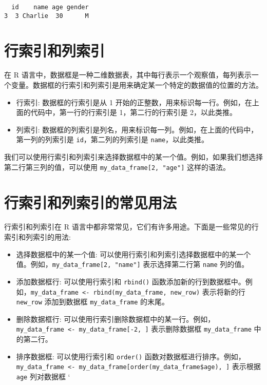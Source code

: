 \documentclass[
  letterpaper,
  DIV=11,
  numbers=noendperiod]{scrreprt}
\providecommand{\tightlist}{%
  \setlength{\itemsep}{0pt}\setlength{\parskip}{0pt}}\usepackage{longtable,booktabs,array}
\begin{document}
\begin{verbatim}
  id    name age gender
3  3 Charlie  30      M
\end{verbatim}

\section{行索引和列索引}\label{ux884cux7d22ux5f15ux548cux5217ux7d22ux5f15-1}

在 R
语言中，数据框是一种二维数据表，其中每行表示一个观察值，每列表示一个变量。数据框的行索引和列索引是用来确定某一个特定的数据值的位置的方法。

\begin{itemize}
\tightlist
\item
  行索引: 数据框的行索引是从 1
  开始的正整数，用来标识每一行。例如，在上面的代码中，第一行的行索引是
  1，第二行的行索引是 2，以此类推。
\item
  列索引:
  数据框的列索引是列名，用来标识每一列。例如，在上面的代码中，第一列的列索引是
  \texttt{id}，第二列的列索引是 \texttt{name}，以此类推。
\end{itemize}

我们可以使用行索引和列索引来选择数据框中的某一个值。例如，如果我们想选择第二行第三列的值，可以使用
\texttt{my\_data\_frame{[}2,\ "age"{]}} 这样的语法。

\section{行索引和列索引的常见用法}\label{ux884cux7d22ux5f15ux548cux5217ux7d22ux5f15ux7684ux5e38ux89c1ux7528ux6cd5-1}

行索引和列索引在 R
语言中都非常常见，它们有许多用途。下面是一些常见的行索引和列索引的用法:

\begin{itemize}
\tightlist
\item
  选择数据框中的某一个值:
  可以使用行索引和列索引选择数据框中的某一个值。例如，\texttt{my\_data\_frame{[}2,\ "name"{]}}
  表示选择第二行第 \texttt{name} 列的值。
\item
  添加数据框行: 可以使用行索引和 \texttt{rbind()}
  函数添加新的行到数据框中。例如，\texttt{my\_data\_frame\ \textless{}-\ rbind(my\_data\_frame,\ new\_row)}
  表示将新的行 \texttt{new\_row} 添加到数据框 \texttt{my\_data\_frame}
  的末尾。
\item
  删除数据框行:
  可以使用行索引删除数据框中的某一行。例如，\texttt{my\_data\_frame\ \textless{}-\ my\_data\_frame{[}-2,\ {]}}
  表示删除数据框 \texttt{my\_data\_frame} 中的第二行。
\item
  排序数据框: 可以使用行索引和 \texttt{order()}
  函数对数据框进行排序。例如，\texttt{my\_data\_frame\ \textless{}-\ my\_data\_frame{[}order(my\_data\_frame\$age),\ {]}}
  表示根据 \texttt{age} 列对数据框 `
\end{itemize}
\end{document}
